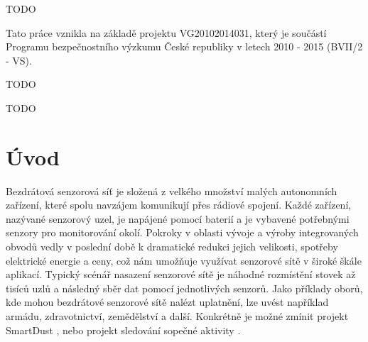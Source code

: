 \documentclass[11pt,final,twoside]{fithesis2}
\begin{document}
\FrontMatter
\ThesisTitlePage

\begin{ThesisDeclaration}
  \DeclarationText
  \AdvisorName
\end{ThesisDeclaration}

\begin{ThesisThanks}
TODO

Tato práce vznikla na základě projektu VG20102014031, který je součástí
Programu bezpečnostního výzkumu České republiky v letech 2010 - 2015
(BVII/2 - VS).
\end{ThesisThanks}

\begin{ThesisAbstract}
TODO
\end{ThesisAbstract}

\begin{ThesisKeyWords}
TODO
\end{ThesisKeyWords}

\MainMatter

\tableofcontents

\chapter{Úvod}

Bezdrátová senzorová síť je složená z velkého množství malých autonomních zařízení, které spolu navzájem komunikují přes rádiové spojení. Každé zařízení, nazývané senzorový uzel, je napájené pomocí
baterií a je vybavené potřebnými senzory pro monitorování okolí. Pokroky v oblasti vývoje a výroby integrovaných obvodů vedly v poslední době k dramatické redukci jejich velikosti, spotřeby elektrické 
energie a ceny, což nám umožňuje využívat senzorové sítě v široké škále aplikací. Typický scénář nasazení senzorové sítě je náhodné rozmístění stovek až tisíců uzlů a následný sběr dat pomocí jednotlivých 
senzorů. Jako příklady oborů, kde mohou bezdrátové senzorové sítě nalézt uplatnění, lze uvést například armádu, zdravotnictví, zemědělství a další. Konkrétně je možné zmínit projekt SmartDust 
\cite{Kahn1999}, nebo projekt sledování sopečné aktivity \cite{Werner-Allen2006}. 
\end{document}

